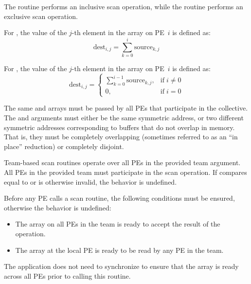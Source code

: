 \begin{apidefinition}
{  The  routine performs an inclusive scan
  operation, while the  routine performs an
  exclusive scan operation.  

  For , the value of the $j$-th element in
  the  array on \ac{PE}~$i$ is defined as:
  \begin{equation*}
    \textrm{dest}_{i,j} = \displaystyle\sum_{k=0}^{i} \textrm{source}_{k,j}
  \end{equation*}

  For , the value of the $j$-th element in
  the  array on \ac{PE}~$i$ is defined as:
  \begin{equation*}
    \textrm{dest}_{i,j} =
    \begin{cases}
    \displaystyle\sum_{k=0}^{i-1} \textrm{source}_{k,j}, & \text{if} \; i \neq 0 \\
    0,  & \text{if} \; i = 0
    \end{cases}
  \end{equation*}


  The same \source{} and \dest{} arrays must be passed by all PEs that
  participate in the collective.
  The \source{} and \dest{} arguments must either be the same
  symmetric address, or two different symmetric addresses
  corresponding to buffers that do not overlap in memory.
  That is, they must be completely overlapping (sometimes referred to as an
  ``in place'' reduction) or completely disjoint.

  Team-based scan routines operate over all \acp{PE} in the provided
  team argument. All \acp{PE} in the provided team must participate in
  the scan operation.  If  compares equal to
   or is otherwise invalid, the
  behavior is undefined.

  Before any \ac{PE} calls a scan routine, the following conditions must be
  ensured, otherwise the behavior is undefined:
  \begin{itemize}
      \item The \dest{} array on all \acp{PE} in the team is ready to accept
          the result of the operation.
      \item The \source{} array at the local \ac{PE} is ready to be read by
          any \ac{PE} in the team.
  \end{itemize}
  The application does not need to synchronize to ensure that the \source{}
  array is ready across all \acp{PE} prior to calling this routine.
  
}
\end{apidefinition}
